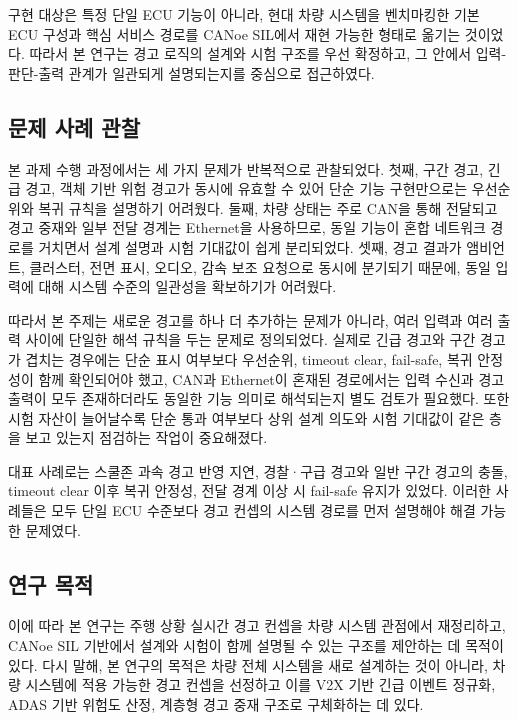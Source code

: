 \documentclass[10pt,a4paper,twocolumn]{article}
\begin{document}
구현 대상은 특정 단일 ECU 기능이 아니라, 현대 차량 시스템을 벤치마킹한 기본 ECU 구성과 핵심 서비스 경로를 CANoe SIL에서 재현 가능한 형태로 옮기는 것이었다. 따라서 본 연구는 경고 로직의 설계와 시험 구조를 우선 확정하고, 그 안에서 입력-판단-출력 관계가 일관되게 설명되는지를 중심으로 접근하였다.

\subsection{문제 사례 관찰}

본 과제 수행 과정에서는 세 가지 문제가 반복적으로 관찰되었다. 첫째, 구간 경고, 긴급 경고, 객체 기반 위험 경고가 동시에 유효할 수 있어 단순 기능 구현만으로는 우선순위와 복귀 규칙을 설명하기 어려웠다. 둘째, 차량 상태는 주로 CAN을 통해 전달되고 경고 중재와 일부 전달 경계는 Ethernet을 사용하므로, 동일 기능이 혼합 네트워크 경로를 거치면서 설계 설명과 시험 기대값이 쉽게 분리되었다. 셋째, 경고 결과가 앰비언트, 클러스터, 전면 표시, 오디오, 감속 보조 요청으로 동시에 분기되기 때문에, 동일 입력에 대해 시스템 수준의 일관성을 확보하기가 어려웠다.

따라서 본 주제는 새로운 경고를 하나 더 추가하는 문제가 아니라, 여러 입력과 여러 출력 사이에 단일한 해석 규칙을 두는 문제로 정의되었다. 실제로 긴급 경고와 구간 경고가 겹치는 경우에는 단순 표시 여부보다 우선순위, timeout clear, fail-safe, 복귀 안정성이 함께 확인되어야 했고, CAN과 Ethernet이 혼재된 경로에서는 입력 수신과 경고 출력이 모두 존재하더라도 동일한 기능 의미로 해석되는지 별도 검토가 필요했다. 또한 시험 자산이 늘어날수록 단순 통과 여부보다 상위 설계 의도와 시험 기대값이 같은 층을 보고 있는지 점검하는 작업이 중요해졌다.

대표 사례로는 스쿨존 과속 경고 반영 지연, 경찰·구급 경고와 일반 구간 경고의 충돌, timeout clear 이후 복귀 안정성, 전달 경계 이상 시 fail-safe 유지가 있었다. 이러한 사례들은 모두 단일 ECU 수준보다 경고 컨셉의 시스템 경로를 먼저 설명해야 해결 가능한 문제였다.

\subsection{연구 목적}

이에 따라 본 연구는 주행 상황 실시간 경고 컨셉을 차량 시스템 관점에서 재정리하고, CANoe SIL 기반에서 설계와 시험이 함께 설명될 수 있는 구조를 제안하는 데 목적이 있다. 다시 말해, 본 연구의 목적은 차량 전체 시스템을 새로 설계하는 것이 아니라, 차량 시스템에 적용 가능한 경고 컨셉을 선정하고 이를 V2X 기반 긴급 이벤트 정규화, ADAS 기반 위험도 산정, 계층형 경고 중재 구조로 구체화하는 데 있다.
\end{document}
